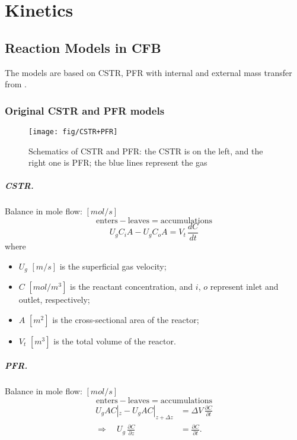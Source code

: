 \chapter{Kinetics}

\section{Reaction Models in CFB}
The models are based on CSTR, PFR with internal and external mass transfer from \citet{jiang1991baffle}.

\subsection{Original CSTR and PFR models}
\begin{figure}[h!]
    \raggedleft
    \texttt{[image: fig/CSTR+PFR]}
    \caption{Schematics of CSTR and PFR: the CSTR is on the left, and the right one is PFR; the blue lines represent the gas}
    \label{fig: CSTR + PFR} 
\end{figure}

\paragraph{CSTR. }
Balance in mole flow:
$[\si{mol/s}]$
\begin{equation*}
    \mathrm{enters}-\mathrm{leaves}=\mathrm{accumulations}
\end{equation*}
\begin{equation}
    U_g C_i A - U_g C_o A = V_t \, \frac{dC}{dt}
    \label{eq: kinetics - original CSTR}
\end{equation}
where
\begin{itemize}
    \item $U_g$ $[\si{m/s}]$ is the superficial gas velocity;
    \item $C$ $[\si{mol/m^3}]$ is the reactant concentration, and $i$, $o$ represent inlet and outlet, respectively;
    \item $A$ $[\si{m^2}]$ is the cross-sectional area of the reactor;
    \item $V_t$ $[\si{m^3}]$ is the total volume of the reactor.
\end{itemize}

\paragraph{PFR. }
Balance in mole flow:
$[\si{mol/s}]$
\begin{equation*}
    \mathrm{enters}-\mathrm{leaves}=\mathrm{accumulations}
\end{equation*}
\begin{align}
    U_g A C|_z - U_g A C|_{z+\Delta z}
     & = \Delta V \, \frac{\partial C}{\partial t} \\
    \Longrightarrow \quad
    U_g \, \frac{\partial C}{\partial z}
     & = \frac{\partial C}{\partial t}.
    \label{eq: kinetics - original PFR}
\end{align}

